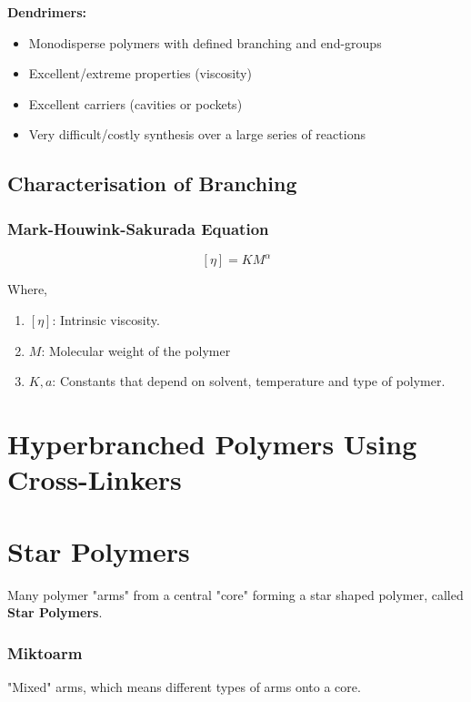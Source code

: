 \documentclass{NoteThesis/note-thesis}
\begin{document}
\textbf{Dendrimers:}
\begin{itemize}
    \item[$\checkmark$] Monodisperse polymers with defined branching and end-groups
    \item[$\checkmark$] Excellent/extreme properties (viscosity)
    \item[$\checkmark$] Excellent carriers (cavities or pockets)
    \item[$\times$] Very difficult/costly synthesis over a large series of reactions
\end{itemize}

\subsection{Characterisation of Branching}

\subsubsection*{Mark-Houwink-Sakurada Equation}

\[
[\eta ] = KM^\alpha
\]

Where,
\begin{enumerate}
    \item $[\eta ]$: Intrinsic viscosity.
    \item $M$: Molecular weight of the polymer
    \item $K,a$: Constants that depend on solvent, temperature and type of polymer.
\end{enumerate}

\section[Hyperbranched through Strathclyde]{Hyperbranched Polymers Using Cross-Linkers}

\section{Star Polymers}

Many polymer "arms" from a central "core" forming a star shaped polymer, called \textbf{Star Polymers}.

\subsubsection*{Miktoarm}

"Mixed" arms, which means different types of arms onto a core.
\end{document}
